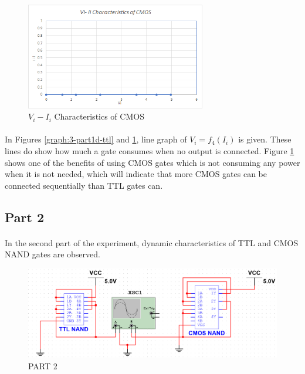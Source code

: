 \documentclass[pdftex,12pt,a4paper]{article}
\begin{document}
 \begin{figure}[!h]
    	\centering
    	\includegraphics[width=0.7\textwidth]{charts/part1d-cmos-chart.png}
    	\caption{$V_{i} - I_{i}$ Characteristics of CMOS}
    	\label{graph:3-part1d-cmoss}
\end{figure}


\begin{flushleft}
\paragraph{}
In Figures \ref{graph:3-part1d-ttl} and \ref{graph:3-part1d-cmoss}, line graph of $V_i = f_4(I_i)$ is given. These lines do show how much a gate consumes when no output is connected. Figure \ref{graph:3-part1d-cmoss} shows one of the benefits of using CMOS gates which is not consuming any power when it is not needed, which will indicate that more CMOS gates can be connected sequentially than TTL gates can.
\end{flushleft}

\newpage
\subsection{Part 2}

\paragraph{}
In the second part of the experiment, dynamic characteristics of TTL and CMOS NAND gates are observed.


 \begin{figure}[h]
    	\centering
    	\includegraphics[width=1\textwidth]{part2.png}
    	\caption{PART 2}
    	\label{fig:5 part2}
\end{figure}
\end{document}
